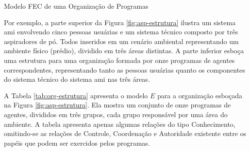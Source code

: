 \begin{section}{Modelo FEC de uma Organização de Programas}
\begin{itemize}
        
    \end{itemize}
    
    Por exemplo, a parte superior da Figura \ref{fig:asp-estrutura} ilustra um sistema \acrshort{ami} envolvendo cinco pessoas usuárias e um sistema técnico composto por três aspiradores de pó. Todos inseridos em um cenário ambiental representando um ambiente físico (prédio), dividido em três áreas distintas. A parte inferior esboça uma estrutura para uma organização formada por onze programas de agentes correspondentes, representando tanto as pessoas usuárias quanto os componentes do sistema técnico do sistema \acrshort{ami} nas três áreas.
    
    \begin{figure}[h!]
        \centering
    \end{figure}
    
    A Tabela \ref{tab:org-estrutura} apresenta o modelo $E$ para a organização esboçada na Figura \ref{fig:asp-estrutura}. Ela mostra um conjunto de onze programas de agentes, divididos em três grupos, cada grupo responsável por uma área do ambiente. A tabela apresenta apenas algumas relações do tipo Conhecimento, omitindo-se as relações de Controle, Coordenação e Autoridade existente entre os papéis que podem ser exercidos pelos programas.
    
    \begin{table}[h!]   
        \centering
\end{table}
\end{section}
